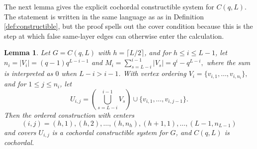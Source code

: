 \documentclass[12pt]{article}
\newtheorem{lemma}[theorem]{Lemma}
\theoremstyle{definition}
\begin{document}
\medskip



\medskip

The next lemma gives the explicit cochordal constructible system for $C(q,L)$.  The statement is written in the same language as as in Definition \ref{def:constructible}, but the proof spells out the cover condition because this is the step at which false same-layer edges can otherwise enter the calculation.

\medskip

\begin{lemma}\label{lem:chain-cochordal-system}
	Let $G=C(q,L)$ with $h=\lceil L/2\rceil$, and for $h\leq i\leq L-1$, let
	$ n_i=|V_i|=(q-1)q^{L-i-1} $
	and
	$ M_i=\sum_{s=L-i}^{i-1}|V_s|=q^i-q^{L-i}, $
	where the sum is interpreted as $0$ when $L-i>i-1$.  With vertex ordering $
	V_i=\{v_{i,1},\ldots,v_{i,n_i}\},$ and for $1\leq j\leq n_i$, let
	$$
	U_{i,j}=\left(\bigcup_{s=L-i}^{i-1}V_s\right)\cup\{v_{i,1},\ldots,v_{i,j-1}\}.
	$$
	Then the ordered construction with centers
	$$
	(i,j)=(h,1),(h,2),\ldots,(h,n_h),(h+1,1),\ldots,(L-1,n_{L-1})
	$$
	and covers $U_{i,j}$ is a cochordal constructible system for $G$, and $C(q,L)$ is cochordal.
\end{lemma}
\end{document}
